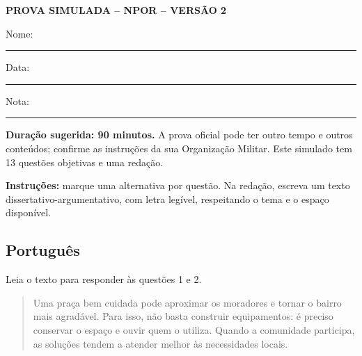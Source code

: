 \documentclass[12pt,a4paper]{article}
\begin{document}
\begin{center}
  {\Large\bfseries PROVA SIMULADA -- NPOR -- VERSÃO 2}\par
  \vspace{0.4cm}
  Nome: \rule{9cm}{0.4pt}\par\vspace{0.3cm}
  Data: \rule{4cm}{0.4pt}\hfill Nota: \rule{3cm}{0.4pt}
\end{center}

\noindent\textbf{Duração sugerida: 90 minutos.} A prova oficial pode ter outro tempo e outros conteúdos; confirme as instruções da sua Organização Militar. Este simulado tem 13 questões objetivas e uma redação.

\medskip
\noindent\textbf{Instruções:} marque uma alternativa por questão. Na redação, escreva um texto dissertativo-argumentativo, com letra legível, respeitando o tema e o espaço disponível.

\subsection*{Português}
Leia o texto para responder às questões 1 e 2.

\begin{quote}
Uma praça bem cuidada pode aproximar os moradores e tornar o bairro mais agradável. Para isso, não basta construir equipamentos: é preciso conservar o espaço e ouvir quem o utiliza. Quando a comunidade participa, as soluções tendem a atender melhor às necessidades locais.
\end{quote}
\end{document}
